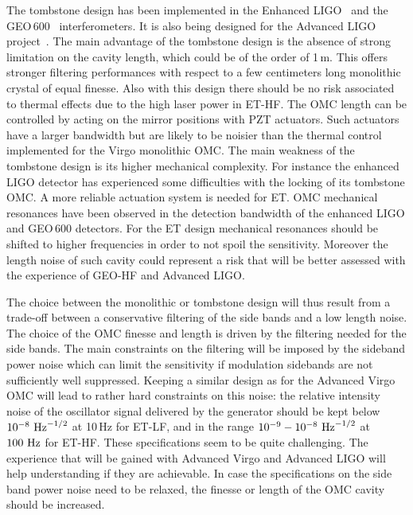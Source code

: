 The tombstone design has been implemented in the Enhanced LIGO~\cite{LIGO-T1000276} and the GEO\,600~\cite{Degallaix10, Prijatelj10} 
interferometers. It is also being designed for the Advanced LIGO project~\cite{LIGO-T1000276}. The main advantage of the tombstone 
design is the absence of strong limitation on the cavity length, which could be of the order of 1\,m. This offers stronger filtering 
performances with respect to a few centimeters long monolithic crystal of equal finesse. Also with this design there should be no
 risk associated to thermal effects due to the high laser power in ET-HF. The OMC length can be controlled by acting on the mirror 
 positions with PZT actuators. Such actuators have a larger bandwidth but are likely to be noisier than the thermal control implemented 
 for the Virgo monolithic OMC. The main weakness of the tombstone design is its higher mechanical complexity. For instance the
  enhanced LIGO detector has experienced some difficulties with the locking of its tombstone OMC. A more reliable actuation system is 
  needed for ET. OMC mechanical resonances have been observed in the detection bandwidth of the  enhanced LIGO and GEO\,600 detectors.
   For the ET design mechanical resonances should be shifted to higher frequencies in order to not spoil the sensitivity. Moreover the
    length noise of such cavity could represent a risk that will be better assessed with the experience of GEO-HF and Advanced LIGO.

The choice between the monolithic or tombstone design will thus result from a trade-off between a conservative filtering of the side 
bands and a low length noise.
The choice of the OMC finesse and length is driven by the filtering needed for the side bands. The main constraints on the filtering 
will be imposed by the sideband power noise which can limit the sensitivity if modulation sidebands are not sufficiently well suppressed. 
Keeping a similar design as for the Advanced Virgo OMC will lead to rather hard constraints on this noise: the relative intensity noise 
of the oscillator signal delivered by the generator should be kept below $10^{-8}~{\rm Hz}^{-1/2}$ at 10\,Hz for ET-LF, and in the range 
$10^{-9}-10^{-8}~{\rm Hz}^{-1/2}$ at $100~{\rm Hz}$ for ET-HF. These specifications seem to be quite challenging. The experience that will be 
gained with Advanced Virgo and Advanced LIGO will help understanding if they are achievable. In case the specifications on the side 
band power noise need to be relaxed, the finesse or length of the OMC cavity should be increased.

